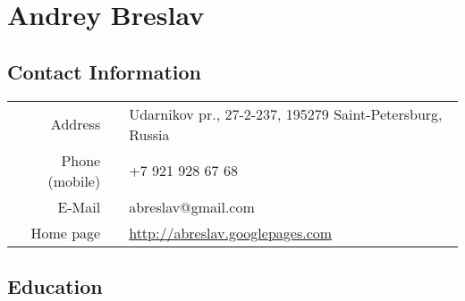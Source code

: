 \documentclass[a4paper, 12pt]{article}
\begin{document}
\section*{Andrey Breslav}

\subsection*{Contact Information}
\begin{tabular}{rll}
	Address &\hspace{10pt}& Udarnikov pr., 27-2-237, 195279 Saint-Petersburg, Russia\\
	Phone (mobile) && +7 921 928 67 68 \\
	E-Mail && abreslav@gmail.com \\
	Home page && \url{http://abreslav.googlepages.com}\\
\end{tabular}

\subsection*{Education}
\end{document}
